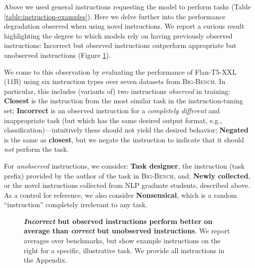Above we used general instructions requesting the model to perform tasks (Table \ref{table:instruction-examples}).
Here we delve further into the performance degradation observed when using novel instructions. %
We report a curious result highlighting the degree to which models rely on having previously observed instructions: Incorrect but observed instructions outperform appropriate but unobserved instructions (Figure \ref{fig:adversarial}).

We come to this observation by evaluating the performance of Flan-T5-XXL (11B) using six instruction types over seven datasets from \textsc{Big-Bench}. %
In particular, this includes (variants of) two instructions \emph{observed} in training:
\textbf{Closest} is the instruction from the most similar task in the instruction-tuning set; \textbf{Incorrect} is an observed instruction for a \emph{completely different} and inappropriate task (but which has the same desired output format, e.g., classification)---intuitively these should not yield the desired behavior; \textbf{Negated} is the same as \textbf{closest}, but we negate the instruction to indicate that it should \emph{not} perform the task.


For \emph{unobserved} instructions, we consider:
\textbf{Task designer}, the instruction (task prefix) provided by the author of the task in \textsc{Big-Bench}, and;
\textbf{Newly collected}, or the novel instructions collected from NLP graduate students, described above.
As a control for reference, we also consider \textbf{Nonsensical}, which is a random ``instruction'' completely irrelevant to any task.


\begin{comment}

\begin{figure}
  \centering
  \texttt{[image: images/adversarial\_w\_examples\_cropped.pdf]}
  \caption{Caption}
  \label{fig:adversarial}
\end{figure}
\end{comment}

\begin{figure}
  \centering
  \caption{{\bf \emph{Incorrect} but observed instructions perform better on average than \emph{correct} but unobserved instructions}. We report averages over benchmarks, but show example instructions on the right for a specific, illustrative task. We provide all instructions in the Appendix.}
  \vspace{-0.5em}
  \label{fig:adversarial}
\end{figure}

